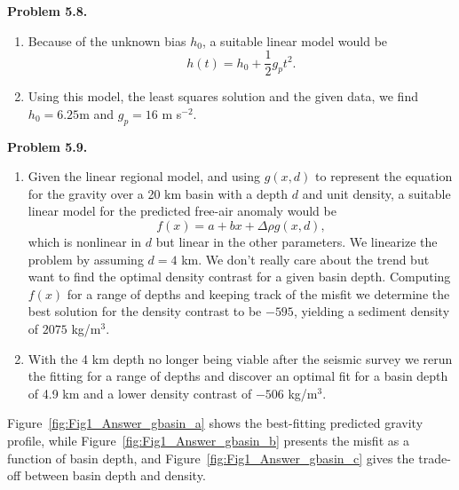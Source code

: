 \bf{Problem 5.8.} \\
\begin{enumerate}[label=\alph*)]
\item Because of the unknown bias $h_0$, a suitable linear model would be
$$
h(t) = h_0 + \frac{1}{2}g_p t^2.
$$
\item
Using this model, the least squares solution and the given data, we find $h_0 = 6.25$m and $g_p = 16$ m s$^{-2}$.
\end{enumerate}

\bf{Problem 5.9.} \\

\begin{enumerate}[label=\alph*)]
\item 	Given the linear regional model, and using $g(x,d)$ to represent the equation for the gravity
        over a 20 km basin with a depth $d$ and unit density, a suitable linear model for the predicted free-air anomaly would be
	$$
	f(x) = a + bx + \Delta \rho g(x,d),
	$$
	which is nonlinear in $d$ but linear in the other parameters.  We linearize the problem
	by assuming $d = 4$ km.  We don't really care about the trend but want
	to find the optimal density contrast for a given basin depth.  Computing $f(x)$ for a range
	of depths and keeping track of the misfit we determine the best solution for the density contrast
	to be $-595$, yielding a sediment density of $2075$ kg/m$^3$.
\item   With the 4 km depth no longer being viable after the seismic survey we rerun the fitting for a
	range of depths and discover an optimal fit for a basin depth of 4.9 km and a lower density
	contrast of $-506$ kg/m$^3$.
\end{enumerate}
Figure~\ref{fig:Fig1_Answer_gbasin_a} shows the best-fitting predicted gravity profile, while
Figure~\ref{fig:Fig1_Answer_gbasin_b} presents the misfit as a function of basin depth, and
Figure~\ref{fig:Fig1_Answer_gbasin_c} gives the trade-off between basin depth and density.

